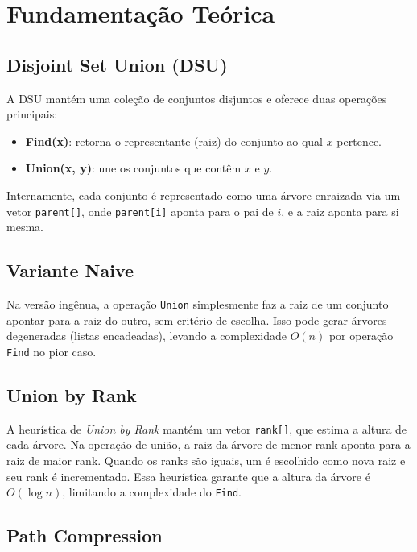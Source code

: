 \documentclass[12pt]{article}
\begin{document}
\section{Fundamentação Teórica}

\subsection{Disjoint Set Union (DSU)}

A DSU mantém uma coleção de conjuntos disjuntos e oferece duas operações principais:

\begin{itemize}
    \item \textbf{Find(x)}: retorna o representante (raiz) do conjunto ao qual $x$ pertence.
    \item \textbf{Union(x, y)}: une os conjuntos que contêm $x$ e $y$.
\end{itemize}

Internamente, cada conjunto é representado como uma árvore enraizada via um vetor \texttt{parent[]}, onde \texttt{parent[i]} aponta para o pai de $i$, e a raiz aponta para si mesma.

\subsection{Variante Naive}

Na versão ingênua, a operação \texttt{Union} simplesmente faz a raiz de um conjunto apontar para a raiz do outro, sem critério de escolha. Isso pode gerar árvores degeneradas (listas encadeadas), levando a complexidade $O(n)$ por operação \texttt{Find} no pior caso.

\subsection{Union by Rank}

A heurística de \emph{Union by Rank} mantém um vetor \texttt{rank[]}, que estima a altura de cada árvore. Na operação de união, a raiz da árvore de menor rank aponta para a raiz de maior rank. Quando os ranks são iguais, um é escolhido como nova raiz e seu rank é incrementado. Essa heurística garante que a altura da árvore é $O(\log n)$, limitando a complexidade do \texttt{Find}.

\subsection{Path Compression}
\end{document}
